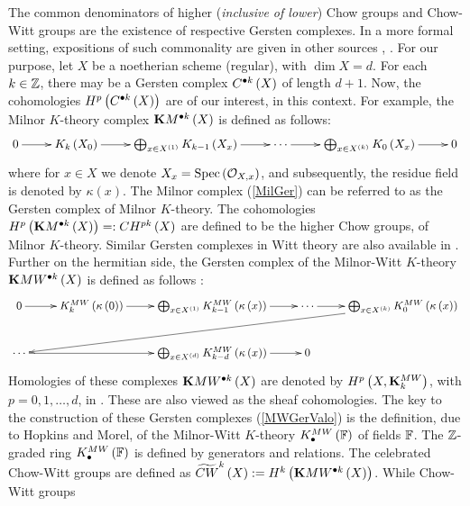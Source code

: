 \documentclass[12pt]{article}
\begin{document}
The common denominators of higher ({\it inclusive of lower}) Chow groups and Chow-Witt groups are the existence of respective Gersten complexes. In a more formal setting,  expositions of such commonality  are given in 
other sources \cite[Chap 4]{M12}, \cite{R96}. For our purpose, 
let $X$ be a noetherian scheme (regular), with $\dim X=d$. For each $k\in {\mathbb {Z}}$, there may be a Gersten complex $C^{{\bullet}k}\left( X\right)$ of length $d+1$. Now, the cohomologies $H^p\left( C^{{\bullet}k}\left( X\right)\right)$ are of our interest, in this context. For example,  the Milnor $K$-theory complex ${\bf K}M^{{\bullet}k}\left( X\right)$ is defined as follows:
 \begin{equation}\label{MilGer}
 \diagram 
 0\ar[r] &  K_k\LRf{X_0} \ar[r] & \bigoplus_{x\in X^{\LRf{1}}} K_{k-1}\LRf{X_x} \ar[r] & \cdots \ar[r] &
 \bigoplus_{x\in X^{\LRf{k}}} K_0\LRf{X_x} \ar[r] & 0\\
 \enddiagram 
 \end{equation}
 where for $x\in X$ we denote $X_x=\mathrm{Spec}\left({\mathcal{O}}_{X, x}\right)$, and subsequently, the residue field is denoted by $\kappa(x)$. 
 The Milnor complex (\ref{MilGer}) can be referred to as the Gersten complex of Milnor $K$-theory. 
 The cohomologies $H^p\left( {\bf K}M^{{\bullet}k}\left( X\right)\right)=:CH^{pk}\left( X\right)$ are defined to be the higher Chow groups,
 of Milnor $K$-theory.  Similar Gersten complexes in Witt theory are also available in \cite{BW2}.
 Further on the hermitian side, the Gersten complex of the Milnor-Witt $K$-theory  
 ${\bf K}MW^{{\bullet}k}\left( X\right)$ is defined as follows \cite{M12}:
 \begin{equation}\label{MWGerValo}
 \diagram 
 0\ar[r] &  K^{MW}_k\LRf{\kappa\LRf{0}} \ar[r] & \bigoplus_{x\in X^{\LRf{1}}} K^{MW}_{k-1}\LRf{\kappa\LRf{x}} \ar[r] & \cdots \ar[r] &
 \bigoplus_{x\in X^{\LRf{k}}} K^{MW}_0\LRf{\kappa\LRf{x}}\ar[dllll] \\
\cdots\ar[rr] && \bigoplus_{x\in X^{\LRf{d}}} K^{MW}_{k-d}\LRf{\kappa\LRf{x}}\ar[r]&0&\\
 \enddiagram 
 \end{equation}
 Homologies of these complexes  ${\bf K}MW^{{\bullet}k}\left( X\right)$ are denoted by $H^p\left( X, {\bf K}_k^{MW}\right)$, with 
 $p=0, 1, \ldots, d$, 
 in \cite{M12}. These are also viewed as the sheaf cohomologies. 
 The key to the construction of these Gersten complexes (\ref{MWGerValo}) is the definition, due to Hopkins and Morel, of the Milnor-Witt $K$-theory 
 $K_{\bullet}^{MW}\left( \mathbb{F}\right)$ of fields ${\mathbb{F}}$. The ${\mathbb {Z}}$-graded ring $K_{\bullet}^{MW}\left( \mathbb{F}\right)$ is defined by generators and relations. 
 The celebrated Chow-Witt groups
 are defined as $\widetilde{CW}^k\left( X\right):= H^k\left( {\bf K}MW^{{\bullet}k}\left( X\right)\right)$. While Chow-Witt groups 
\end{document}
